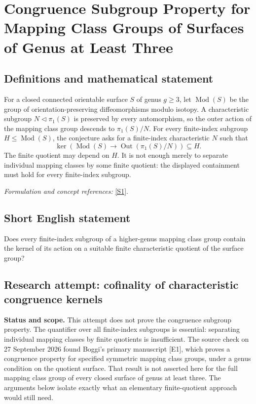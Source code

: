\documentclass[11pt]{article}
\begin{document}
\section*{\texorpdfstring{Congruence Subgroup Property for Mapping Class Groups of Surfaces of Genus at Least Three}{Congruence Subgroup Property for Mapping Class Groups of Surfaces of Genus at Least Three}}\label{343}
\subsection{Definitions and mathematical statement}
For a closed connected orientable surface $S$ of genus $g\ge3$, let $\operatorname{Mod}(S)$ be the group of orientation-preserving diffeomorphisms modulo isotopy. A characteristic subgroup $N\triangleleft\pi_1(S)$ is preserved by every automorphism, so the outer action of the mapping class group descends to $\pi_1(S)/N$. For every finite-index subgroup $H\le\operatorname{Mod}(S)$, the conjecture asks for a finite-index characteristic $N$ such that
\[
 \ker\!\left(\operatorname{Mod}(S)\longrightarrow
 \operatorname{Out}(\pi_1(S)/N)\right)\subseteq H.
\]
The finite quotient may depend on $H$. It is not enough merely to separate individual mapping classes by some finite quotient: the displayed containment must hold for every finite-index subgroup.
\par\smallskip\textit{Formulation and concept references:} \href{https://arxiv.org/pdf/math/0608325}{[S1]}.

\subsection{Short English statement}
Does every finite-index subgroup of a higher-genus mapping class group contain the kernel of its action on a suitable finite characteristic quotient of the surface group?
\subsection{Research attempt: cofinality of characteristic congruence kernels}
\textbf{Status and scope.} This attempt does not prove the congruence subgroup property. The quantifier over all finite-index subgroups is essential: separating individual mapping classes by finite quotients is insufficient. The source check on 27 September 2026 found Boggi's primary manuscript [E1], which proves a congruence property for specified symmetric mapping class groups, under a genus condition on the quotient surface. That result is not asserted here for the full mapping class group of every closed surface of genus at least three. The arguments below isolate exactly what an elementary finite-quotient approach would still need.
\end{document}
